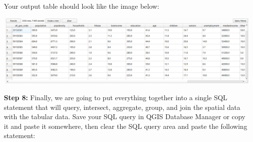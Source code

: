 \documentclass[
]{book}
\begin{document}
Your output table should look like the image below:

\includegraphics[width=0.75\linewidth]{images/05-qgis-query-characteristics}

\textbf{Step 8:} Finally, we are going to put everything together into a single SQL statement that will query, intersect, aggregate, group, and join the spatial data with the tabular data. Save your SQL query in QGIS Database Manager or copy it and paste it somewhere, then clear the SQL query area and paste the following statement:
\end{document}
